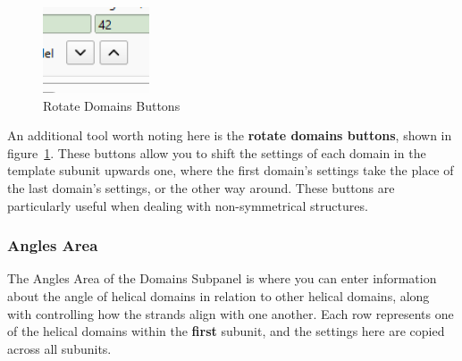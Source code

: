 \documentclass[titlepage]{article}
\begin{document}
\begin{figure}[h] \label{fig:rotate-domains-arrows}
	\caption{Rotate Domains Buttons}
	\centering
	\includegraphics[height=1in]{rotate-domains-arrows.png}
\end{figure}

An additional tool worth noting here is the \textbf{rotate domains buttons}, shown in figure~\ref{fig:rotate-domains-arrows}. These buttons allow you to shift the settings of each domain in the template subunit upwards one, where the first domain's settings take the place of the last domain's settings, or the other way around. These buttons are particularly useful when dealing with non-symmetrical structures.

\subsubsection{Angles Area}
\label{sect:domains-tab-angles-area}

The Angles Area of the Domains Subpanel is where you can enter information about the angle of helical domains in relation to other helical domains, along with controlling how the strands align with one another. Each row represents one of the helical domains within the \textbf{first} subunit, and the settings here are copied across all subunits.
\end{document}
